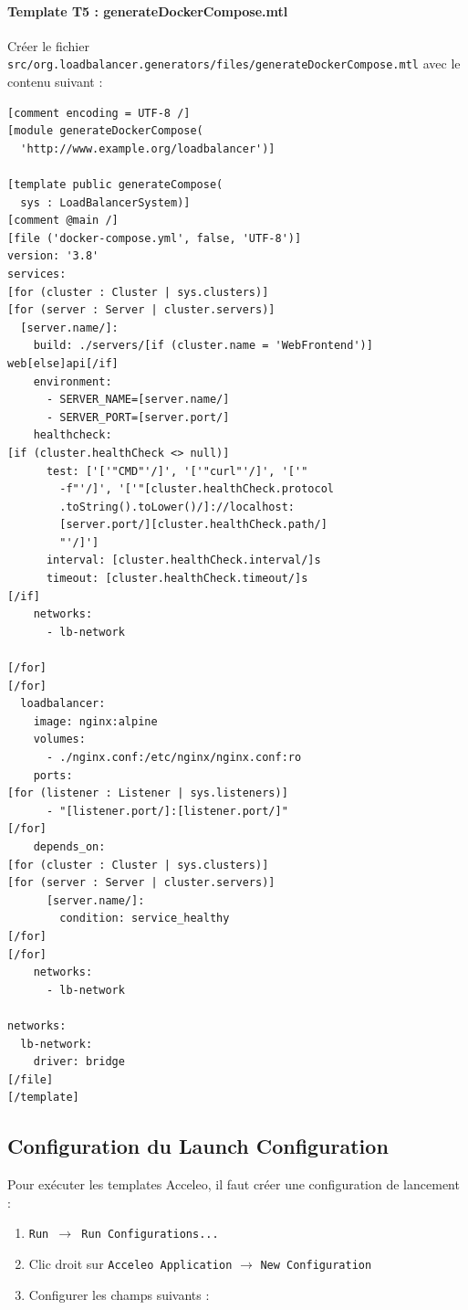 \documentclass[12pt,a4paper]{report}
\begin{document}
\paragraph{Template T5 : generateDockerCompose.mtl}

Créer le fichier \texttt{src/org.loadbalancer.generators/files/generateDockerCompose.mtl} avec le contenu suivant :

\begin{lstlisting}[caption={Template Acceleo generateDockerCompose.mtl}]
[comment encoding = UTF-8 /]
[module generateDockerCompose(
  'http://www.example.org/loadbalancer')]

[template public generateCompose(
  sys : LoadBalancerSystem)]
[comment @main /]
[file ('docker-compose.yml', false, 'UTF-8')]
version: '3.8'
services:
[for (cluster : Cluster | sys.clusters)]
[for (server : Server | cluster.servers)]
  [server.name/]:
    build: ./servers/[if (cluster.name = 'WebFrontend')]
web[else]api[/if]
    environment:
      - SERVER_NAME=[server.name/]
      - SERVER_PORT=[server.port/]
    healthcheck:
[if (cluster.healthCheck <> null)]
      test: ['['"CMD"'/]', '['"curl"'/]', '['"
        -f"'/]', '['"[cluster.healthCheck.protocol
        .toString().toLower()/]://localhost:
        [server.port/][cluster.healthCheck.path/]
        "'/]']
      interval: [cluster.healthCheck.interval/]s
      timeout: [cluster.healthCheck.timeout/]s
[/if]
    networks:
      - lb-network

[/for]
[/for]
  loadbalancer:
    image: nginx:alpine
    volumes:
      - ./nginx.conf:/etc/nginx/nginx.conf:ro
    ports:
[for (listener : Listener | sys.listeners)]
      - "[listener.port/]:[listener.port/]"
[/for]
    depends_on:
[for (cluster : Cluster | sys.clusters)]
[for (server : Server | cluster.servers)]
      [server.name/]:
        condition: service_healthy
[/for]
[/for]
    networks:
      - lb-network

networks:
  lb-network:
    driver: bridge
[/file]
[/template]
\end{lstlisting}

\subsection{Configuration du Launch Configuration}

Pour exécuter les templates Acceleo, il faut créer une configuration de lancement :

\begin{enumerate}
  \item \texttt{Run $\rightarrow$ Run Configurations...}
  \item Clic droit sur \texttt{Acceleo Application} $\rightarrow$ \texttt{New Configuration}
  \item Configurer les champs suivants :
\end{enumerate}
\end{document}
